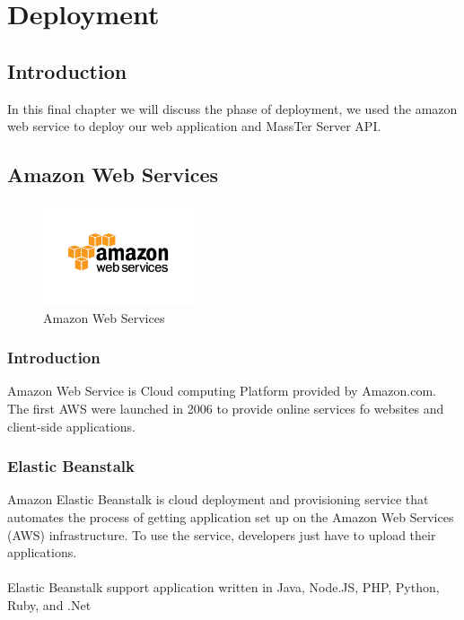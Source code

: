 \chapter{Deployment}

	\section{Introduction}
	In this final chapter we will discuss the phase of deployment, we used the amazon web service to deploy our web application and MassTer Server API.
	\section{Amazon Web Services}
	\begin{figure}[h]
		\centering
		\includegraphics[width=0.4\textwidth]{aws-logo.png}
		\caption[Amazon Web Services]{Amazon Web Services \cite{ref14}}
	\end{figure}
	\subsection{Introduction}
	Amazon Web Service is Cloud computing Platform provided by Amazon.com. The first AWS were launched in 2006 to provide online services fo websites and client-side applications.
	\clearpage
	\newpage
	\subsection{Elastic Beanstalk}
	Amazon Elastic Beanstalk is cloud deployment and provisioning service that automates the process of getting application set up on the Amazon Web Services (AWS) infrastructure. To use the service, developers just have to upload their applications.
	\\
	\\
	Elastic Beanstalk support application written in Java, Node.JS, PHP, Python, Ruby, and .Net

